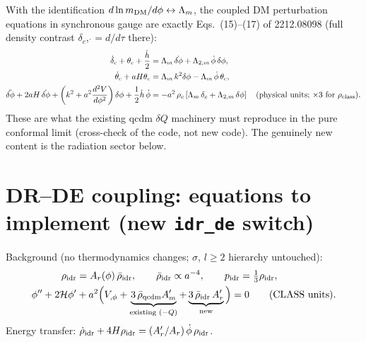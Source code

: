 \documentclass[11pt]{article}
\newcommand{\rhob}{\bar\rho}
\newcommand{\Am}{A_{m}}
\newcommand{\Ar}{A_{r}}
\newcommand{\cH}{\mathcal{H}}
\begin{document}
With the identification $d\ln m_{\rm DM}/d\phi \leftrightarrow \Lambda_m$, the coupled DM
perturbation equations in synchronous gauge are exactly Eqs.~(15)--(17) of 2212.08098
(full density contrast $\delta_c$, $\dot{}=d/d\tau$ there):
\begin{align}
\dot\delta_c + \theta_c + \frac{\dot h}{2}
&= \Lambda_m\,\dot{\delta\phi} + \Lambda_{2,m}\,\dot\phi\,\delta\phi ,
\label{eq:dmcont}\\
\dot\theta_c + aH\theta_c
&= \Lambda_m\,k^2\delta\phi - \Lambda_m\,\dot\phi\,\theta_c ,
\label{eq:dmeuler}\\
\ddot{\delta\phi} + 2aH\,\dot{\delta\phi}
+ \left(k^2 + a^2 \frac{d^2V}{d\phi^2}\right)\delta\phi + \frac12\dot h\,\dot\phi
&= -a^2\,\rho_{c}\left[\Lambda_m\,\delta_c + \Lambda_{2,m}\,\delta\phi\right]
\quad\text{(physical units; $\times3$ for $\rho_{\rm class}$).}
\label{eq:dmdKG}
\end{align}
These are what the existing qcdm $\delta Q$ machinery must reproduce in the pure
conformal limit (cross-check of the code, not new code). The genuinely new content
is the radiation sector below.

\section{DR--DE coupling: equations to implement (new \texttt{idr\_de} switch)}

Background (no thermodynamics changes; $\sigma$, $l\ge2$ hierarchy untouched):
\begin{align}
\rho_{\rm idr} &= \Ar(\phi)\,\rhob_{\rm idr},
\qquad \rhob_{\rm idr}\propto a^{-4},
\qquad p_{\rm idr}=\tfrac13\rho_{\rm idr},
\label{eq:idrbg}\\
\phi''+2\cH\phi' &+ a^{2}\Big(V_{,\phi}
+ \underbrace{3\,\rhob_{\rm qcdm}\Am'}_{\text{existing }(-Q)}
+ \underbrace{3\,\rhob_{\rm idr}\,\Ar'}_{\text{new}}\Big)=0
\qquad\text{(CLASS units).}
\label{eq:KGcode}
\end{align}
Energy transfer: $\dot\rho_{\rm idr}+4H\rho_{\rm idr}=(\Ar'/\Ar)\,\dot\phi\,\rho_{\rm idr}$.
\end{document}
